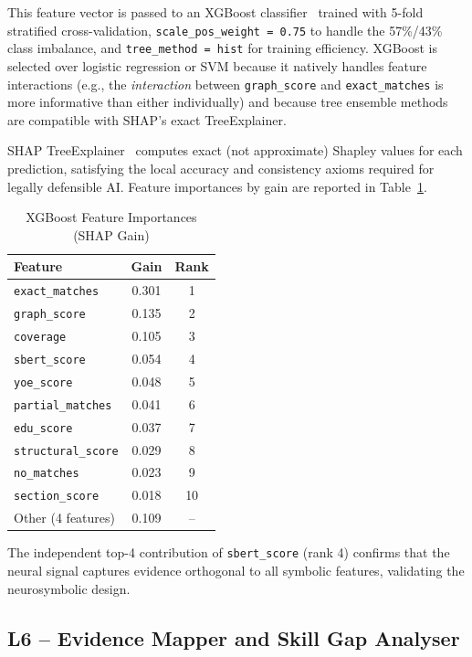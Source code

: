 \documentclass[conference]{IEEEtran}
\begin{document}
This feature vector is passed to an XGBoost
classifier~\cite{chen2016xgboost} trained with 5-fold stratified
cross-validation, \texttt{scale\_pos\_weight = 0.75} to handle the
57\%/43\% class imbalance, and \texttt{tree\_method = hist} for
training efficiency. XGBoost is selected over logistic regression or
SVM because it natively handles feature interactions (e.g., the
\textit{interaction} between \texttt{graph\_score} and
\texttt{exact\_matches} is more informative than either individually)
and because tree ensemble methods are compatible with SHAP's exact
TreeExplainer.

SHAP TreeExplainer~\cite{lundberg2017shap} computes exact (not
approximate) Shapley values for each prediction, satisfying
the local accuracy and consistency axioms required for legally
defensible AI. Feature importances by gain are reported in
Table~\ref{tab:shap_features}.

\begin{table}[htbp]
\caption{XGBoost Feature Importances (SHAP Gain)}
\label{tab:shap_features}
\centering
\begin{tabular}{lcc}
\toprule
\textbf{Feature} & \textbf{Gain} & \textbf{Rank} \\
\midrule
\texttt{exact\_matches}    & 0.301 & 1 \\
\texttt{graph\_score}      & 0.135 & 2 \\
\texttt{coverage}          & 0.105 & 3 \\
\texttt{sbert\_score}      & 0.054 & 4 \\
\texttt{yoe\_score}        & 0.048 & 5 \\
\texttt{partial\_matches}  & 0.041 & 6 \\
\texttt{edu\_score}        & 0.037 & 7 \\
\texttt{structural\_score} & 0.029 & 8 \\
\texttt{no\_matches}       & 0.023 & 9 \\
\texttt{section\_score}    & 0.018 & 10 \\
Other (4 features)         & 0.109 & -- \\
\bottomrule
\end{tabular}
\end{table}

The independent top-4 contribution of \texttt{sbert\_score} (rank 4)
confirms that the neural signal captures evidence orthogonal to all
symbolic features, validating the neurosymbolic design.

\subsection{L6 -- Evidence Mapper and Skill Gap Analyser}
\end{document}

